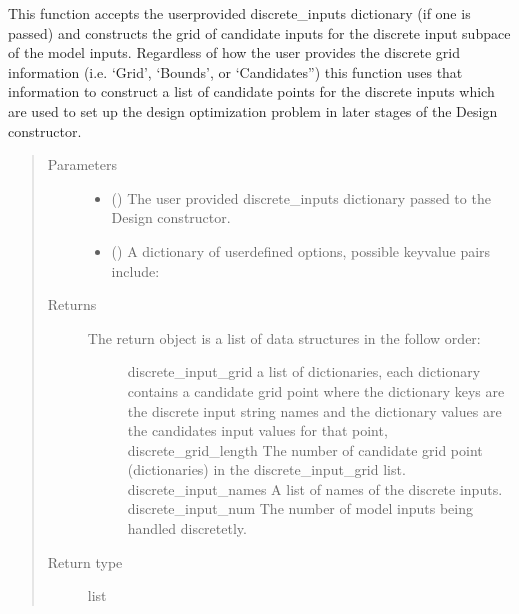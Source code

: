 \documentclass[letterpaper,10pt,english,openany,oneside]{sphinxmanual}
\begin{document}
\begin{fulllineitems}
\begin{fulllineitems}
This function accepts the user\sphinxhyphen{}provided discrete\_inputs dictionary (if one is passed) and
constructs the grid of candidate inputs for the discrete input subpace of the model inputs.
Regardless of how the user provides the discrete grid information (i.e. ‘Grid’, ‘Bounds’, or
‘Candidates”) this function uses that information to construct a list of candidate points
for the discrete inputs which are used to set up the design optimization problem in later
stages of the Design constructor.
\begin{quote}\begin{description}
\item[{Parameters}] \leavevmode\begin{itemize}
\item {} 
 () \textendash{} The user provided discrete\_inputs dictionary passed to the
Design constructor.

\item {} 
 (\sphinxstyleliteralemphasis{\sphinxupquote{, }}) \textendash{} A dictionary of user\sphinxhyphen{}defined options, possible key\sphinxhyphen{}value
pairs include:

\end{itemize}

\item[{Returns}] \leavevmode
\begin{description}
\item[{The return object is a list of data structures in the follow order:}] \leavevmode
discrete\_input\_grid \textendash{} a list of dictionaries, each dictionary contains a candidate
grid point where the dictionary keys are the discrete input string names and
the dictionary values are the candidates input values for that point,
discrete\_grid\_length \textendash{} The number of candidate grid point (dictionaries) in the
discrete\_input\_grid list.
discrete\_input\_names \textendash{} A list of names of the discrete inputs.
discrete\_input\_num \textendash{} The number of model inputs being handled discretetly.

\end{description}


\item[{Return type}] \leavevmode
list


\end{description}
\end{quote}
\end{fulllineitems}
\end{fulllineitems}
\end{document}

